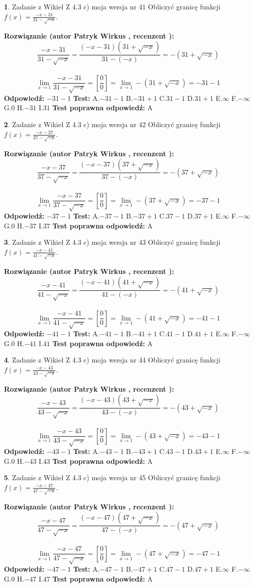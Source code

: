\documentclass[12pt, a4paper]{article}
\theoremstyle{definition} %
\newtheorem{zad}{}
\newcommand{\zadStart}[1]{\begin{zad}#1\newline}
\newcommand{\zadStop}{\end{zad}}
\newcommand{\rozwStart}[2]{\noindent \textbf{Rozwiązanie (autor #1 , recenzent #2): }\newline}
\newcommand{\rozwStop}{\newline}
\newcommand{\odpStart}{\noindent \textbf{Odpowiedź:}\newline}
\newcommand{\odpStop}{\newline}
\newcommand{\testStart}{\noindent \textbf{Test:}\newline}
\newcommand{\testStop}{\newline}
\newcommand{\kluczStart}{\noindent \textbf{Test poprawna odpowiedź:}\newline}
\newcommand{\kluczStop}{\newline}
\begin{document}
\zadStart{Zadanie z Wikieł Z 4.3 c) moja wersja nr 41}
Obliczyć granicę funkcji $f(x)=\frac{-x-31}{31-\sqrt{-x}}$.
\zadStop
\rozwStart{Patryk Wirkus}{}
$$\frac{-x-31}{31-\sqrt{-x}}=\frac{(-x-31)(31+\sqrt{-x})}{31-(-x)}=-(31+\sqrt{-x})$$
\\
$$\lim\limits_{x\to1}\frac{-x-31}{31-\sqrt{-x}}=[\frac{0}{0}]=\lim\limits_{x\to1}-(31+\sqrt{-x}) =-31-1$$
\rozwStop
\odpStart
$-31-1$
\odpStop
\testStart
A.$-31-1$
B.$-31+1$
C.$31-1$
D.$31+1$
E.$\infty$
F.$-\infty$
G.$0$
H.$-31$
I.$31$
\testStop
\kluczStart
A
\kluczStop



\zadStart{Zadanie z Wikieł Z 4.3 c) moja wersja nr 42}
Obliczyć granicę funkcji $f(x)=\frac{-x-37}{37-\sqrt{-x}}$.
\zadStop
\rozwStart{Patryk Wirkus}{}
$$\frac{-x-37}{37-\sqrt{-x}}=\frac{(-x-37)(37+\sqrt{-x})}{37-(-x)}=-(37+\sqrt{-x})$$
\\
$$\lim\limits_{x\to1}\frac{-x-37}{37-\sqrt{-x}}=[\frac{0}{0}]=\lim\limits_{x\to1}-(37+\sqrt{-x}) =-37-1$$
\rozwStop
\odpStart
$-37-1$
\odpStop
\testStart
A.$-37-1$
B.$-37+1$
C.$37-1$
D.$37+1$
E.$\infty$
F.$-\infty$
G.$0$
H.$-37$
I.$37$
\testStop
\kluczStart
A
\kluczStop



\zadStart{Zadanie z Wikieł Z 4.3 c) moja wersja nr 43}
Obliczyć granicę funkcji $f(x)=\frac{-x-41}{41-\sqrt{-x}}$.
\zadStop
\rozwStart{Patryk Wirkus}{}
$$\frac{-x-41}{41-\sqrt{-x}}=\frac{(-x-41)(41+\sqrt{-x})}{41-(-x)}=-(41+\sqrt{-x})$$
\\
$$\lim\limits_{x\to1}\frac{-x-41}{41-\sqrt{-x}}=[\frac{0}{0}]=\lim\limits_{x\to1}-(41+\sqrt{-x}) =-41-1$$
\rozwStop
\odpStart
$-41-1$
\odpStop
\testStart
A.$-41-1$
B.$-41+1$
C.$41-1$
D.$41+1$
E.$\infty$
F.$-\infty$
G.$0$
H.$-41$
I.$41$
\testStop
\kluczStart
A
\kluczStop



\zadStart{Zadanie z Wikieł Z 4.3 c) moja wersja nr 44}
Obliczyć granicę funkcji $f(x)=\frac{-x-43}{43-\sqrt{-x}}$.
\zadStop
\rozwStart{Patryk Wirkus}{}
$$\frac{-x-43}{43-\sqrt{-x}}=\frac{(-x-43)(43+\sqrt{-x})}{43-(-x)}=-(43+\sqrt{-x})$$
\\
$$\lim\limits_{x\to1}\frac{-x-43}{43-\sqrt{-x}}=[\frac{0}{0}]=\lim\limits_{x\to1}-(43+\sqrt{-x}) =-43-1$$
\rozwStop
\odpStart
$-43-1$
\odpStop
\testStart
A.$-43-1$
B.$-43+1$
C.$43-1$
D.$43+1$
E.$\infty$
F.$-\infty$
G.$0$
H.$-43$
I.$43$
\testStop
\kluczStart
A
\kluczStop



\zadStart{Zadanie z Wikieł Z 4.3 c) moja wersja nr 45}
Obliczyć granicę funkcji $f(x)=\frac{-x-47}{47-\sqrt{-x}}$.
\zadStop
\rozwStart{Patryk Wirkus}{}
$$\frac{-x-47}{47-\sqrt{-x}}=\frac{(-x-47)(47+\sqrt{-x})}{47-(-x)}=-(47+\sqrt{-x})$$
\\
$$\lim\limits_{x\to1}\frac{-x-47}{47-\sqrt{-x}}=[\frac{0}{0}]=\lim\limits_{x\to1}-(47+\sqrt{-x}) =-47-1$$
\rozwStop
\odpStart
$-47-1$
\odpStop
\testStart
A.$-47-1$
B.$-47+1$
C.$47-1$
D.$47+1$
E.$\infty$
F.$-\infty$
G.$0$
H.$-47$
I.$47$
\testStop
\kluczStart
A
\kluczStop
\end{document}
